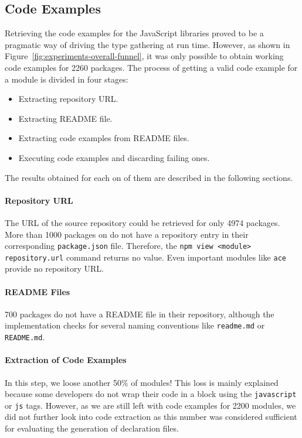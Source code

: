\documentclass[a4paper,english,cleveref, autoref]{lipics-v2019}
\newcommand{\figref}[1]{Figure~\ref{#1}}
\begin{document}
\subsection{Code Examples}
Retrieving the code examples for the JavaScript libraries proved to be
a pragmatic way of driving the type gathering at run time. However, as
shown in \figref{fig:experiments-overall-funnel}, it was only possible
to obtain working code examples for 2260 packages. The
process of getting a valid code example for a module is divided in four
stages: 
\begin{itemize}
\item Extracting repository URL.
\item Extracting README file.
\item Extracting code examples from README files.
\item Executing code examples and discarding failing ones.
\end{itemize}

The results obtained for each on of them are described in the
following sections. 

\paragraph*{Repository URL}
The URL of the source repository could be retrieved for only 4974
packages. More than 1000 packages on \NPM{} do not have a repository
entry in their corresponding \texttt{package.json} file. Therefore, the
\texttt{npm view <module> repository.url} command returns no
value. Even important modules like \texttt{ace} provide no repository URL.

\paragraph*{README Files}
700 packages do not have a README file in their repository, although
the implementation checks for several naming conventions like
\texttt{readme.md} or \texttt{README.md}. 

\paragraph*{Extraction of Code Examples}
In this step, we loose another 50\% of modules! This loss is mainly
explained because some developers do not wrap their code in a block
using the \texttt{javascript} or \texttt{js} tags. However, as we are
still left with code examples for 2200 modules, we did not further
look into code extraction as this number was considered sufficient for
evaluating the generation of declaration files. 
\end{document}
